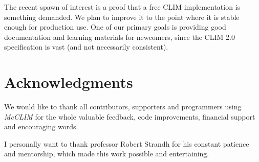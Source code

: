\documentclass{sig-alternate-05-2015}
\begin{document}
The recent spawn of interest is a proof that a free CLIM implementation is
something demanded. We plan to improve it to the point where it is
stable enough for production use. One of our primary goals is
providing good documentation and learning materials for newcomers,
since the CLIM 2.0 specification is vast (and not necessarily consistent).

\section{Acknowledgments}

We would like to thank all contributors, supporters and
programmers using \emph{McCLIM} for the whole valuable feedback, code
improvements, financial support and encouraging words.

I personally want to thank professor Robert Strandh for his constant
patience and mentorship, which made this work possible and
entertaining.



\end{document}
